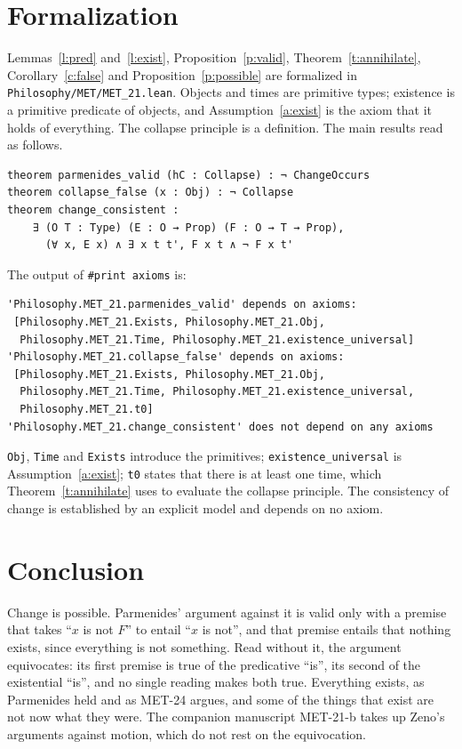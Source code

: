\documentclass{situationist-preprint}
\begin{document}
\section{Formalization}

Lemmas~\ref{l:pred} and~\ref{l:exist}, Proposition~\ref{p:valid}, Theorem~\ref{t:annihilate}, Corollary~\ref{c:false} and Proposition~\ref{p:possible} are formalized in \nolinkurl{Philosophy/MET/MET_21.lean}. Objects and times are primitive types; existence is a primitive predicate of objects, and Assumption~\ref{a:exist} is the axiom that it holds of everything. The collapse principle is a definition. The main results read as follows.

\begin{lstlisting}
theorem parmenides_valid (hC : Collapse) : ¬ ChangeOccurs
theorem collapse_false (x : Obj) : ¬ Collapse
theorem change_consistent :
    ∃ (O T : Type) (E : O → Prop) (F : O → T → Prop),
      (∀ x, E x) ∧ ∃ x t t', F x t ∧ ¬ F x t'
\end{lstlisting}

The output of \texttt{\#print axioms} is:

\begin{lstlisting}
'Philosophy.MET_21.parmenides_valid' depends on axioms:
 [Philosophy.MET_21.Exists, Philosophy.MET_21.Obj,
  Philosophy.MET_21.Time, Philosophy.MET_21.existence_universal]
'Philosophy.MET_21.collapse_false' depends on axioms:
 [Philosophy.MET_21.Exists, Philosophy.MET_21.Obj,
  Philosophy.MET_21.Time, Philosophy.MET_21.existence_universal,
  Philosophy.MET_21.t0]
'Philosophy.MET_21.change_consistent' does not depend on any axioms
\end{lstlisting}

\texttt{Obj}, \texttt{Time} and \texttt{Exists} introduce the primitives; \texttt{existence\_universal} is Assumption~\ref{a:exist}; \texttt{t0} states that there is at least one time, which Theorem~\ref{t:annihilate} uses to evaluate the collapse principle. The consistency of change is established by an explicit model and depends on no axiom.

\section{Conclusion}

Change is possible. Parmenides' argument against it is valid only with a premise that takes \enquote{$x$ is not $F$} to entail \enquote{$x$ is not}, and that premise entails that nothing exists, since everything is not something. Read without it, the argument equivocates: its first premise is true of the predicative \enquote{is}, its second of the existential \enquote{is}, and no single reading makes both true. Everything exists, as Parmenides held and as MET-24 argues, and some of the things that exist are not now what they were. The companion manuscript MET-21-b takes up Zeno's arguments against motion, which do not rest on the equivocation.
\end{document}

